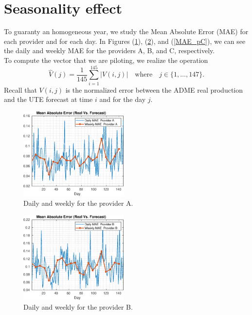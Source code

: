 \documentclass[aoas,preprint]{imsart}
\begin{document}

\tableofcontents

\section{Seasonality effect}

To guaranty an homogeneous year, we study the Mean Absolute Error (MAE) for each provider and for each day. In Figures (\ref{MAE_pA}), (\ref{MAE_pB}), and (\ref{MAE_pC}), we can see the daily and weekly MAE for the providers A, B, and C, respectively.\\
To compute the vector that we are piloting, we realize the operation
\begin{equation*}
\hat{V}(j) =\frac{1}{145} \sum_{i=1}^{145}|V(i,j)|\quad\text{where}\quad j\in\{1,\dots,147\}.
\end{equation*}
Recall that $V(i,j)$ is the normalized error between the ADME real production and the UTE forecast at time $i$ and for the day $j$.

\begin{figure}[H]
\centering
\includegraphics[width=0.485\textwidth]{plots/mean_errors/prov_A/MAE.eps}
\caption{Daily and weekly for the provider A.}
\label{MAE_pA}
\end{figure}

\begin{figure}[H]
\centering
\includegraphics[width=0.485\textwidth]{plots/mean_errors/prov_B/MAE.eps}
\caption{Daily and weekly for the provider B.}
\label{MAE_pB}
\end{figure}
\end{document}
